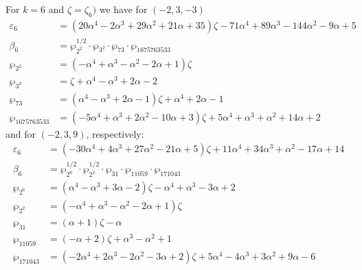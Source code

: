 \documentclass[12pt]{amsart}
\theoremstyle{definition}
\def\a{\alpha}
\def\z{\zeta}
\def\z{\zeta}
\begin{document}
\noindent 
For $k=6$ and $\zeta=\zeta_6)$ we have for $(-2,3,-3)$
{\small
\begin{align*}
\varepsilon_{6} &= 
(20 \a^4 - 2 \a^3 + 29 \a^2 + 21 \a + 35) \z - 71 \a^4 + 89 \a^3 - 144 \a^2 - 9 \a + 5
\\
\beta_{6} &= \wp_{2^2}^{1/2} \cdot \wp_{3^2} 
\cdot \wp_{73} \cdot \wp_{1675763533} \\
\wp_{2^2} &= (-\a^4 + \a^3 - \a^2 - 2 \a + 1) \z
\\
\wp_{3^2} &= \z + \a^4 - \a^3 + 2 \a - 2
\\
\wp_{73} &=
(\a^4 - \a^3 + 2 \a - 1) \z + \a^4 + 2 \a - 1
\\
\wp_{1675763533} &=
(-5 \a^4 + \a^3 + 2 \a^2 - 10 \a + 3) \z + 5 \a^4 + \a^3 + \a^2 + 14 \a + 2
\end{align*}
}
and for $(-2,3,9)$, respectively:
{\small
\begin{align*}
\varepsilon_{6} &= 
(-30 \a^4 + 4 \a^3 + 27 \a^2 - 21 \a + 5) \z + 11 \a^4 + 34 \a^3 + \a^2 - 17 \a + 14
\\
\beta_{6} &= \wp_{2^6}^{1/2} \cdot \wp_{2^2}^{1/2} \cdot \wp_{31}
\cdot \wp_{11059} \cdot \wp_{171043} \\
\wp_{2^6} &= (\a^4 - \a^3 + 3 \a - 2) \z - \a^4 + \a^3 - 3 \a + 2
\\
\wp_{2^2} &= (-\a^4 + \a^3 - \a^2 - 2 \a + 1) \z
\\
\wp_{31} &= (\a + 1) \z - \a
\\
\wp_{11059} &= (-\a + 2) \z + \a^3 - \a^2 + 1
\\
\wp_{171043} &=
(-2 \a^4 + 2 \a^3 - 2 \a^2 - 3 \a + 2) \z + 5 \a^4 - 4 \a^3 + 3 \a^2 + 9 \a - 6
\end{align*}
}
\end{document}
